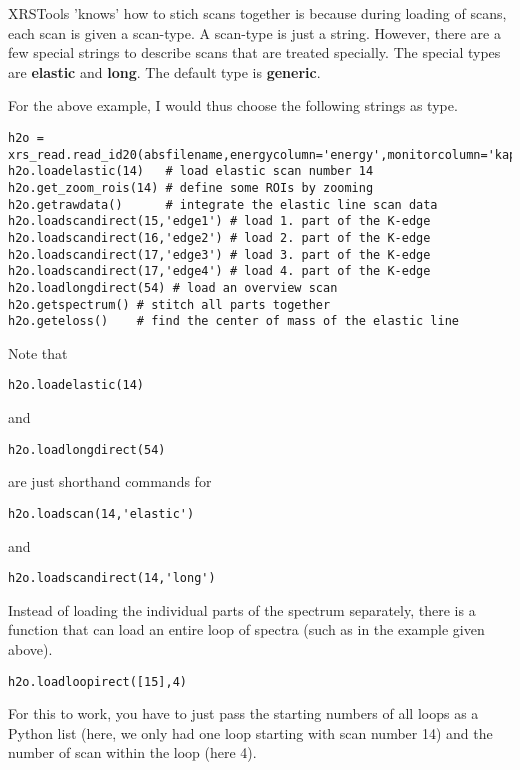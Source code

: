 \documentclass[aps,prl,groupedaddress]{revtex4}
\begin{document}
XRSTools 'knows' how to stich scans together is because during loading of scans, each scan is given a scan-type. A scan-type is just a string. However, there are a few special strings to describe scans that are treated specially. The special types are \textbf{elastic} and \textbf{long}. The default type is \textbf{generic}.

For the above example, I would thus choose the following strings as type.
\lstset{language=Python, breaklines=true}
\begin{lstlisting}[frame=single]
h2o = xrs_read.read_id20(absfilename,energycolumn='energy',monitorcolumn='kap4dio',edfName=None,single_image=True)
h2o.loadelastic(14)   # load elastic scan number 14
h2o.get_zoom_rois(14) # define some ROIs by zooming
h2o.getrawdata()      # integrate the elastic line scan data
h2o.loadscandirect(15,'edge1') # load 1. part of the K-edge
h2o.loadscandirect(16,'edge2') # load 2. part of the K-edge
h2o.loadscandirect(17,'edge3') # load 3. part of the K-edge
h2o.loadscandirect(17,'edge4') # load 4. part of the K-edge
h2o.loadlongdirect(54) # load an overview scan
h2o.getspectrum() # stitch all parts together
h2o.geteloss()    # find the center of mass of the elastic line
\end{lstlisting}

Note that 
\begin{lstlisting}[frame=single]
h2o.loadelastic(14)
\end{lstlisting}
and
\begin{lstlisting}[frame=single]
h2o.loadlongdirect(54)
\end{lstlisting}
are just shorthand commands for 
\begin{lstlisting}[frame=single]
h2o.loadscan(14,'elastic')
\end{lstlisting}
and
\begin{lstlisting}[frame=single]
h2o.loadscandirect(14,'long')
\end{lstlisting}

Instead of loading the individual parts of the spectrum separately, there is a function that can load an entire loop of spectra (such as in the example given above).
\begin{lstlisting}[frame=single]
h2o.loadloopirect([15],4)
\end{lstlisting}
For this to work, you have to just pass the starting numbers of all loops as a Python list (here, we only had one loop starting with scan number 14) and the number of scan within the loop (here 4). 
\end{document}
